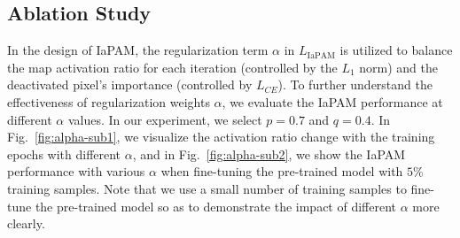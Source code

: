 \begin{table}[t]
    \centering
    \footnotesize
        \caption{Accuracy Degradation and Defense Overhead}

    \label{tab: different models}
\end{table}



\subsection{Ablation Study} \label{sec: ablations}
In the design of IaPAM, the regularization term $\alpha$ in $L_{\text{IaPAM}}$ is utilized to balance the map activation ratio for each iteration (controlled by the $L_1$ norm) and the deactivated pixel's importance (controlled by $L_{CE}$).
To further understand the effectiveness of regularization weights $\alpha$, we evaluate the IaPAM performance at different $\alpha$ values. 
In our experiment, we select $p=0.7$ and $q=0.4$. In Fig.~\ref{fig:alpha-sub1}, we visualize the activation ratio change with the training epochs with different $\alpha$, and in Fig.~\ref{fig:alpha-sub2}, we show the IaPAM performance with various $\alpha$ when fine-tuning the pre-trained model with $5\%$ training samples.
Note that we use a small number of training samples to fine-tune the pre-trained model so as to demonstrate the impact of different $\alpha$ more clearly.



